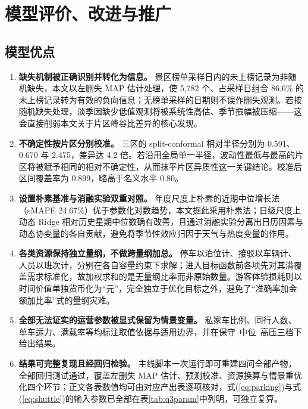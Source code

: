 \documentclass[withoutpreface,bwprint]{cumcmthesis}
\begin{document}
\section{模型评价、改进与推广}
\subsection{模型优点}
\begin{enumerate}[label=\textbf{（\arabic*）},leftmargin=2.6em,itemsep=3pt]
\item\textbf{缺失机制被正确识别并转化为信息。} 景区榜单采样日内的未上榜记录为非随机缺失，本文以左删失 MAP 估计处理，使 5{,}782 个、占采样日组合 86.6\% 的未上榜记录转为有效的负向信息；无榜单采样的日期则不误作删失观测。若按随机缺失处理，淡季因缺少低值观测将被系统性高估、季节振幅被压缩——这会直接削弱本文关于片区峰谷比差异的核心发现。
\item\textbf{不确定性按片区分别校准。} 三区的 split-conformal 相对半径分别为 0.591、0.670 与 2.475，差异达 4.2 倍。若沿用全局单一半径，波动性最低与最高的片区将被赋予相同的相对不确定性，从而抹平片区异质性这一关键结论。校准后区间覆盖率为 0.899，略高于名义水平 0.80。
\item\textbf{设置朴素基准与消融实验双重对照。} 年度尺度上朴素的近期中位增长法（sMAPE 24.67\%）优于参数化对数趋势，本文据此采用朴素法；日级尺度上动态 Ridge 相对历史星期中位数确有改善，且通过消融实验分离出日历因素与动态协变量的各自贡献，避免将季节性效应归因于天气与热度变量的作用。
\item\textbf{各类资源保持独立量纲，不做跨量纲加总。} 停车以泊位计、接驳以车辆计、人员以班次计，分别在各自容量约束下求解；进入目标函数前各项先对其满覆盖需求标准化，故加权求和的是无量纲比率而非原始数量。游客体验损耗则以时间价值单独货币化为“元”，完全独立于优化目标之外，避免了“准确率加金额加比率”式的量纲灾难。
\item\textbf{全部无法证实的运营参数被显式保留为情景变量。} 私家车比例、同行人数、单车运力、满载率等均标注取值依据与适用边界，并在保守--中位--高压三档下给出结果。
\item\textbf{结果可完整复现且经回归检验。} 主线脚本一次运行即可重建四问全部产物，全部回归测试通过，覆盖左删失 MAP 估计、预测校准、资源换算与情景重优化四个环节；正文各表数值均可由对应产出表逐项核对，式(\ref{eq:parking})与式(\ref{eq:shuttle})的输入参数已全部在表\ref{tab:q3param}中列明，可独立复算。
\end{enumerate}
\end{document}
